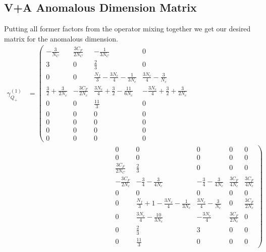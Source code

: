 	\subsection{V+A Anomalous Dimension Matrix}	
	Putting all former factors from the operator mixing together we get our desired matrix for the anomalous dimension.
	\begin{equation}
		\begin{split}
			\label{eq:anomalousDimensionMatrixVpA}
			\gamma^{(1)}_{Q_+} &= 
			\left(\begin{matrix}
				-\frac{3}{N_C} & \frac{3C_F}{2N_C} &-\frac{1}{3N_C} & 0   
				\\
				3 & 0 & \frac{2}{3} & 0    \\
				0 & 0 & \frac{N_f}{3}-\frac{3N_c}{4}-\frac{1}{3N_c} & \frac{3N_c}{4}-\frac{3}{N_c}   \\
				\frac{3}{2}+\frac{3}{2N_c} & -\frac{3C_F}{2N_c} & \frac{3N_c}{4}+\frac{3}{2}-\frac{11}{6N_c} & -\frac{3N_c}{4}+\frac{3}{2}+\frac{3}{2N_c} \\
				0 & 0 & \frac{11}{3} & 0 \\
				0 & 0 & 0 & 0 \\
				0 & 0 & 0 & 0 \\
				0 & 0 & 0 & 0 \\
				0 & 0 & 0 & 0 
			\end{matrix} \right. \\
			&\qquad\qquad\qquad\qquad\qquad\qquad \left.\begin{matrix}
				0 & 0 & 0 & 0 & 0 \\
				0 & 0 & 0 & 0 & 0 \\
				\frac{3C_F}{2N_C} & \frac{2}{3} & 0 & 0 & 0 \\
				-\frac{3C_F}{2N_c} & -\frac{3}{4}-\frac{3}{4N_c} & -\frac{3}{4}-\frac{3}{4N_c} & \frac{3C_F}{4N_c} & \frac{3C_F}{4N_c} \\
				0 & 0 & 0 & 0 & 0 \\
				0 & \frac{N_f}{3}+1-\frac{3N_c}{4}-\frac{1}{3N_c} & \frac{3N_c}{4}-\frac{3}{N_c} & 0  & \frac{3C_F}{2N_c} \\
				0 & \frac{3N_c}{4}-\frac{10}{3N_c} & -\frac{3N_c}{4} & \frac{3C_F}{2N_c} & 0 \\
				0 & \frac{2}{3} & 3 & 0 & 0 \\
				0 & \frac{11}{3} & 0 & 0 & 0 
			\end{matrix}\right)
		\end{split}
	\end{equation}
	\\\\

